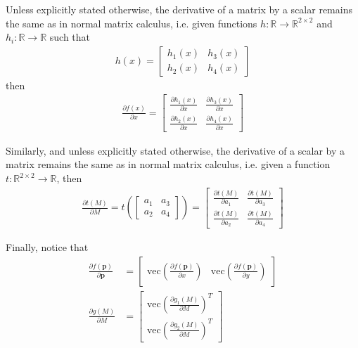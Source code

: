 \documentclass{article}
\newcommand\Real{\mathbb{R}}
\newcommand\vecop[1]{\text{vec} \left( #1\right)}
\begin{document}
Unless explicitly stated otherwise, the derivative of a matrix by a scalar remains the same as in normal matrix calculus, i.e. given functions $h : \Real \to \Real^{2 \times 2}$ and  $h_i : \Real \to \Real$ such that 
\begin{align}
  h(x) = \begin{bmatrix} h_1(x) & h_3(x) \\ h_2(x) & h_4(x) \end{bmatrix}
\end{align}
then 
\begin{align}
  \frac{\partial f(x)}{\partial x} =
    \begin{bmatrix} 
      \frac{\partial h_1(x)}{\partial x} & \frac{\partial h_3(x)}{\partial x} \\[10pt]
      \frac{\partial h_2(x)}{\partial x} & \frac{\partial h_4(x)}{\partial x}
     \end{bmatrix}
\end{align}

Similarly, and unless explicitly stated otherwise, the derivative of a scalar by a matrix remains the same as in normal matrix calculus, i.e. given a function $t : \Real^{2 \times 2} \to \Real$, then
\begin{align}
  \frac{\partial t(M)}{\partial M} =
    t \left( \begin{bmatrix} 
      a_1 & a_3 \\
      a_2 & a_4
    \end{bmatrix} \right)= 
    \begin{bmatrix} 
      \frac{\partial t(M)}{\partial a_1} & \frac{\partial t(M)}{\partial a_3} \\[10pt]
      \frac{\partial t(M)}{\partial a_2} & \frac{\partial t(M)}{\partial a_4}
     \end{bmatrix}
\end{align}

Finally, notice that 
\begin{align}
  \frac{\partial f(\bm{p})}{\partial \bm{p}}
  &= \begin{bmatrix} 
      \vecop{\frac{\partial f(\bm{p})}{\partial x}} & 
      \vecop{\frac{\partial f(\bm{p})}{\partial y}}
    \end{bmatrix}\\
  \frac{\partial g(M)}{\partial M} 
  &= \begin{bmatrix} 
      \vecop{\frac{\partial g_1(M)}{\partial M}}^T \\[5pt]
      \vecop{\frac{\partial g_2(M)}{\partial M}}^T
     \end{bmatrix}
\end{align}
\end{document}
